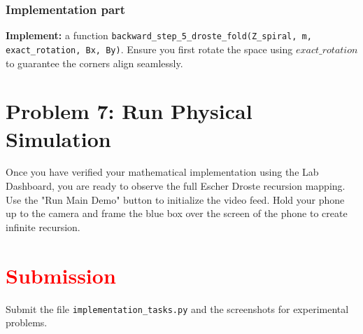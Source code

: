 \documentclass[11pt]{article}
\begin{document}
\subsubsection*{Implementation part}
\textbf{Implement:} a function \lstinline|backward_step_5_droste_fold(Z_spiral, m, exact_rotation, Bx, By)|. Ensure you first rotate the space using $exact\_rotation$ to guarantee the corners align seamlessly.

\section*{Problem 7: Run Physical Simulation}

Once you have verified your mathematical implementation using the Lab Dashboard, you are ready to observe the full Escher Droste recursion mapping. Use the "Run Main Demo" button to initialize the video feed. Hold your phone up to the camera and frame the blue box over the screen of the phone to create infinite recursion.

\section*{\textcolor{red}{Submission}}

Submit the file \texttt{implementation\_tasks.py} and the screenshots for experimental problems.
\end{document}
